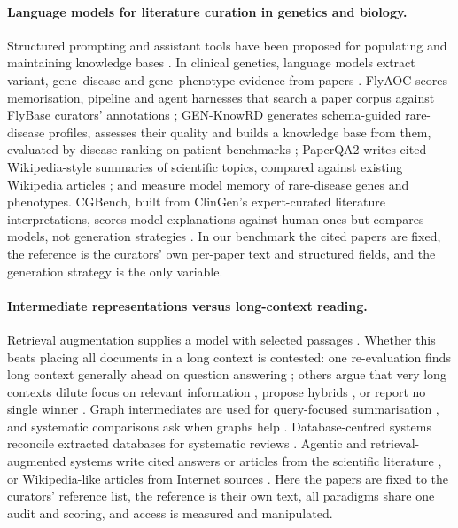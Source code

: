 \documentclass{article} %
\begin{document}
\paragraph{Language models for literature curation in genetics and biology.}
Structured prompting and assistant tools have been proposed for populating and maintaining knowledge bases \citep{caufield2024structured,caufield2024curategpt,toro2024dynamic,niyonkuru2025leveraging}. In clinical genetics, language models extract variant, gene--disease and gene--phenotype evidence from papers \citep{li2025autopm3,furlan2025eagleai,wang2026pubmind,yin2026benchmarking}. FlyAOC scores memorisation, pipeline and agent harnesses that search a paper corpus against FlyBase curators' annotations \citep{zhang2026flyaoc}; GEN-KnowRD generates schema-guided rare-disease profiles, assesses their quality and builds a knowledge base from them, evaluated by disease ranking on patient benchmarks \citep{yan2026genknowrd}; PaperQA2 writes cited Wikipedia-style summaries of scientific topics, compared against existing Wikipedia articles \citep{skarlinski2024language}; and \citet{groza2026systematic} measure model memory of rare-disease genes and phenotypes. CGBench, built from ClinGen's expert-curated literature interpretations, scores model explanations against human ones but compares models, not generation strategies \citep{queen2025cgbench}. In our benchmark the cited papers are fixed, the reference is the curators' own per-paper text and structured fields, and the generation strategy is the only variable.

\paragraph{Intermediate representations versus long-context reading.}
Retrieval augmentation supplies a model with selected passages \citep{Lewis2020RetrievalaugmentedGeneration}. Whether this beats placing all documents in a long context is contested: one re-evaluation finds long context generally ahead on question answering \citep{Li2024LongContext}; others argue that very long contexts dilute focus on relevant information \citep{Yu2024DefenseRag}, propose hybrids \citep{li2024retrieval}, or report no single winner \citep{Li2025LaraBenchmarking}. Graph intermediates are used for query-focused summarisation \citep{edge2024local}, and systematic comparisons ask when graphs help \citep{han2025rag,xiang2025use}. Database-centred systems reconcile extracted databases for systematic reviews \citep{joshi2026sliders}. Agentic and retrieval-augmented systems write cited answers or articles from the scientific literature \citep{Lla2023PaperqaRetrievalaugmented,Asai2024OpenscholarSynthesizing,singh2025ai2,skarlinski2024language}, or Wikipedia-like articles from Internet sources \citep{shao2024assisting}. Here the papers are fixed to the curators' reference list, the reference is their own text, all paradigms share one audit and scoring, and access is measured and manipulated.
\end{document}
